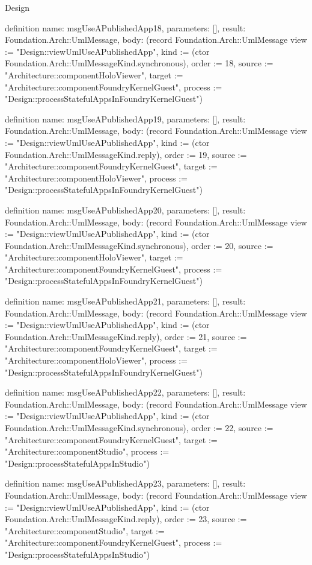 \begin{lexlean}{Design}
\begin{semanticmodule}
definition{
  name: msgUseAPublishedApp18,
  parameters: [],
  result: Foundation.Arch::UmlMessage,
  body: (record Foundation.Arch::UmlMessage {view := "Design::viewUmlUseAPublishedApp", kind := (ctor Foundation.Arch::UmlMessageKind.synchronous), order := 18, source := "Architecture::componentHoloViewer", target := "Architecture::componentFoundryKernelGuest", process := "Design::processStatefulAppsInFoundryKernelGuest"})
}

definition{
  name: msgUseAPublishedApp19,
  parameters: [],
  result: Foundation.Arch::UmlMessage,
  body: (record Foundation.Arch::UmlMessage {view := "Design::viewUmlUseAPublishedApp", kind := (ctor Foundation.Arch::UmlMessageKind.reply), order := 19, source := "Architecture::componentFoundryKernelGuest", target := "Architecture::componentHoloViewer", process := "Design::processStatefulAppsInFoundryKernelGuest"})
}

definition{
  name: msgUseAPublishedApp20,
  parameters: [],
  result: Foundation.Arch::UmlMessage,
  body: (record Foundation.Arch::UmlMessage {view := "Design::viewUmlUseAPublishedApp", kind := (ctor Foundation.Arch::UmlMessageKind.synchronous), order := 20, source := "Architecture::componentHoloViewer", target := "Architecture::componentFoundryKernelGuest", process := "Design::processStatefulAppsInFoundryKernelGuest"})
}

definition{
  name: msgUseAPublishedApp21,
  parameters: [],
  result: Foundation.Arch::UmlMessage,
  body: (record Foundation.Arch::UmlMessage {view := "Design::viewUmlUseAPublishedApp", kind := (ctor Foundation.Arch::UmlMessageKind.reply), order := 21, source := "Architecture::componentFoundryKernelGuest", target := "Architecture::componentHoloViewer", process := "Design::processStatefulAppsInFoundryKernelGuest"})
}

definition{
  name: msgUseAPublishedApp22,
  parameters: [],
  result: Foundation.Arch::UmlMessage,
  body: (record Foundation.Arch::UmlMessage {view := "Design::viewUmlUseAPublishedApp", kind := (ctor Foundation.Arch::UmlMessageKind.synchronous), order := 22, source := "Architecture::componentFoundryKernelGuest", target := "Architecture::componentStudio", process := "Design::processStatefulAppsInStudio"})
}

definition{
  name: msgUseAPublishedApp23,
  parameters: [],
  result: Foundation.Arch::UmlMessage,
  body: (record Foundation.Arch::UmlMessage {view := "Design::viewUmlUseAPublishedApp", kind := (ctor Foundation.Arch::UmlMessageKind.reply), order := 23, source := "Architecture::componentStudio", target := "Architecture::componentFoundryKernelGuest", process := "Design::processStatefulAppsInStudio"})
}


\end{semanticmodule}
\end{lexlean}
